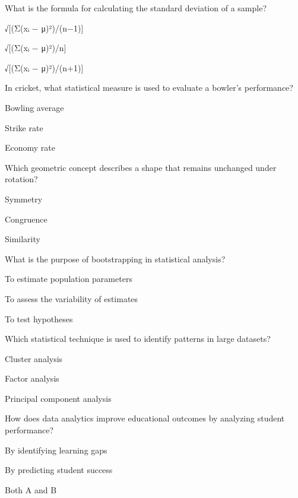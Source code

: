 \begin{enhancedmcq}{What is the formula for calculating the standard deviation of a sample?}
\item √[(Σ(xᵢ − μ)²)/(n−1)]
\item √[(Σ(xᵢ − μ)²)/n]
\item √[(Σ(xᵢ − μ)²)/(n+1)]

\end{enhancedmcq}
\begin{enhancedmcq}{In cricket, what statistical measure is used to evaluate a bowler's performance?}
\item Bowling average
\item Strike rate
\item Economy rate

\end{enhancedmcq}
\begin{enhancedmcq}{Which geometric concept describes a shape that remains unchanged under rotation?}
\item Symmetry
\item Congruence
\item Similarity

\end{enhancedmcq}
\begin{enhancedmcq}{What is the purpose of bootstrapping in statistical analysis?}
\item To estimate population parameters
\item To assess the variability of estimates
\item To test hypotheses

\end{enhancedmcq}
\begin{enhancedmcq}{Which statistical technique is used to identify patterns in large datasets?}
\item Cluster analysis
\item Factor analysis
\item Principal component analysis

\end{enhancedmcq}
\begin{enhancedmcq}{How does data analytics improve educational outcomes by analyzing student performance?}
\item By identifying learning gaps
\item By predicting student success
\item Both A and B

\end{enhancedmcq}
